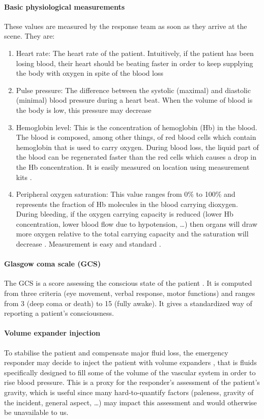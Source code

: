 \paragraph{Basic physiological measurements}
These values are measured by the response team as soon as they arrive at the scene. They are:
\begin{enumerate}
\item Heart rate: The heart rate of the patient. Intuitively, if the patient has been losing blood, their heart should be beating faster in order to keep supplying the body with oxygen in spite of the blood loss \cite{gutierrez2004clinical}
\item Pulse pressure: The difference between the systolic (maximal) and diastolic (minimal) blood pressure during a heart beat. When the volume of blood is the body is low, this pressure may decrease \cite{gutierrez2004clinical}
\item Hemoglobin level: This is the concentration of hemoglobin (Hb) in the blood. The blood is composed, among other things, of red blood cells which contain hemoglobin that is used to carry oxygen. During blood loss, the liquid part of the blood can be regenerated faster than the red cells \cite{gutierrez2004clinical} which causes a drop in the Hb concentration\cite{figueiredo2018Hb}. It is easily measured on location using measurement kits \cite{lamhaut2011hemocue}.
\item Peripheral oxygen saturation: This value ranges from 0\% to 100\% and represents the fraction of Hb molecules in the blood carrying dioxygen. During bleeding, if the oxygen carrying capacity is reduced (lower Hb concentration, lower blood flow due to hypotension, \ldots) then organs will draw more oxygen relative to the total carrying capacity and the saturation will decrease \cite{cohn2007saturation}. Measurement is easy and standard \cite{rall1999oxymetry}.
\end{enumerate}

\paragraph{Glasgow coma scale (GCS)}
The GCS is a score assessing the conscious state of the patient \cite{jones1979GCS}. It is computed from three criteria (eye movement, verbal response, motor functions) and ranges from 3 (deep coma or death) to 15 (fully awake). It gives a standardized way of reporting a patient's consciousness.

\paragraph{Volume expander injection}
To stabilise the patient and compensate major fluid loss, the emergency responder may decide to inject the patient with volume expanders \cite{kramer2003expander}, that is fluids specifically designed to fill some of the volume of the vascular system in order to rise blood pressure. This is a proxy for the responder's assessment of the patient's gravity, which is useful since many hard-to-quantify factors (paleness, gravity of the incident, general aspect, \ldots) may impact this assessment and would otherwise be unavailable to us.

